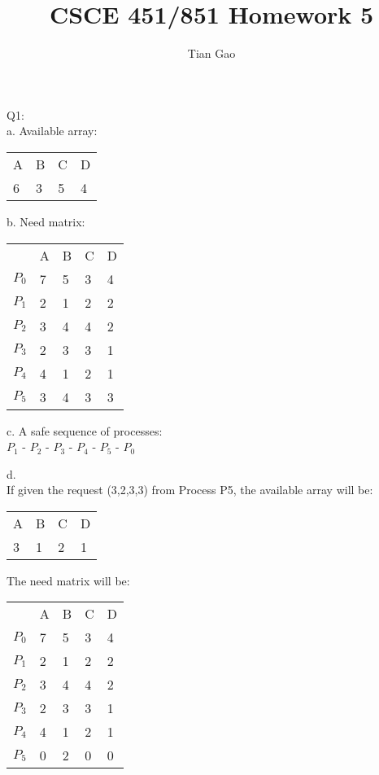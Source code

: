 \documentclass[a4paper]{article}
\title{CSCE 451/851 Homework 5}
\author{Tian Gao}
\begin{document}
\maketitle

Q1:\\
a. Available array:\\
\begin{table}[!htb]
    \begin{tabular}{llll}
        A & B & C & D \\
        6 & 3 & 5 & 4
    \end{tabular}
\end{table}

b. Need matrix:\\
\begin{table}[!htb]
    \begin{tabular}{lllll}
              & A & B & C & D \\
        $P_0$ & 7 & 5 & 3 & 4 \\
        $P_1$ & 2 & 1 & 2 & 2 \\
        $P_2$ & 3 & 4 & 4 & 2 \\
        $P_3$ & 2 & 3 & 3 & 1 \\
        $P_4$ & 4 & 1 & 2 & 1 \\
        $P_5$ & 3 & 4 & 3 & 3
    \end{tabular}
\end{table}

c. A safe sequence of processes:\\
$P_1$ - $P_2$ - $P_3$ - $P_4$ - $P_5$ - $P_0$

d. \\
If given the request (3,2,3,3) from Process P5, the available array will be:
\begin{table}[!htb]
    \begin{tabular}{llll}
        A & B & C & D \\
        3 & 1 & 2 & 1
    \end{tabular}
\end{table}

The need matrix will be:
\begin{table}[!htb]
    \begin{tabular}{lllll}
              & A & B & C & D \\
        $P_0$ & 7 & 5 & 3 & 4 \\
        $P_1$ & 2 & 1 & 2 & 2 \\
        $P_2$ & 3 & 4 & 4 & 2 \\
        $P_3$ & 2 & 3 & 3 & 1 \\
        $P_4$ & 4 & 1 & 2 & 1 \\
        $P_5$ & 0 & 2 & 0 & 0
    \end{tabular}
\end{table}
\end{document}
